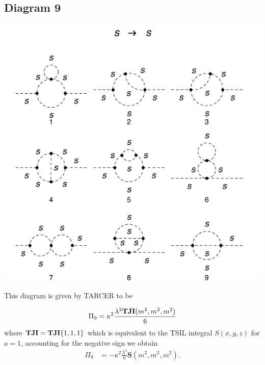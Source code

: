 \documentclass[11pt]{article}
\begin{document}
\subsection*{Diagram 9}
\noindent\begin{minipage}{0.3\textwidth}
\begin{center}
\includegraphics{2loop_9.pdf}
\end{center}
\end{minipage}
\noindent\begin{minipage}{0.7\textwidth}
This diagram is given by TARCER to be

 \begin{align}
 \Pi_9 =\kappa^2 \frac{\lambda^2 {\tt{\mathbf{TJI}}}(m^2,m^2,m^2) }{6}
 \end{align}
 where ${\tt{\mathbf{TJI}}} = {\tt{\mathbf{TJI}}}\{1,1,1\}$ which is equivalent to the TSIL integral $S(x,y,z)$ for $a=1$, accounting for the negative sign we obtain
 \begin{align*}
 \Pi_9 & = -\kappa^2\frac{\lambda^2}{6}\textbf{S}(m^2,m^2,m^2).
 \end{align*}
 \end{minipage}
 
\end{document}
